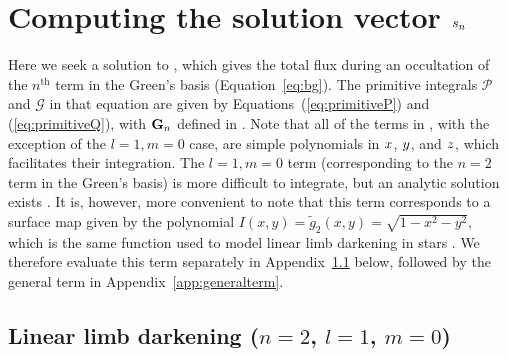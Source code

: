 \documentclass[modern]{aastex61}
\begin{document}
\section{Computing the solution vector $\MakeLowercase{s_n}$}
\label{app:solutionvector}

Here we seek a solution to , which gives the total flux
during an occultation of the $n^\mathrm{th}$ term in the Green's basis
(Equation~\ref{eq:bg}). The primitive integrals $\mathcal{P}$ and
$\mathcal{G}$ in that equation are given by Equations~(\ref{eq:primitiveP})
and (\ref{eq:primitiveQ}), with
${\mathbf{G}}_n$ defined in . Note that all of the terms in ,
with the exception of the $l = 1, m = 0$ case, are simple polynomials
in $\mbox{$x$}$, $\mbox{$y$}$, and $\mbox{$z$}$, which facilitates their integration.
The $l = 1, m = 0$ term (corresponding to the $n = 2$ term in the Green's basis)
is more difficult to integrate, but an analytic
solution exists \citep{Pal2012}. It is, however, more convenient
to note that this term corresponds to a surface map given by the polynomial
$I(x, y) = \tilde{g}_2(x, y) = \sqrt{1 - x^2 - y^2}$, which is the same function used
to model linear limb darkening in stars \citep{MandelAgol2002}. We therefore
evaluate this term separately in Appendix~\ref{app:linearld} below, followed by
the general term in Appendix~\ref{app:generalterm}.

\subsection{Linear limb darkening ($n = 2$, $l=1$, $m=0$)}
\label{app:linearld}
\end{document}
